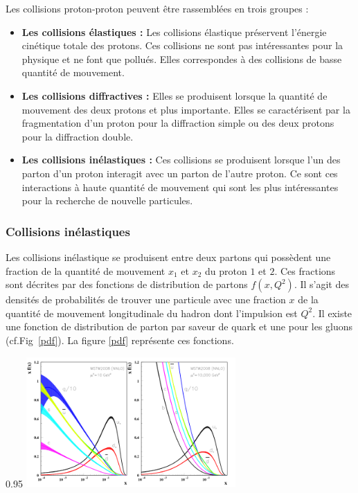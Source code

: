 Les collisions proton-proton peuvent être rassemblées en trois groupes :
\begin{itemize}[label=$\bullet$]
	\item \textbf{Les collisions élastiques : } Les collisions élastique préservent l'énergie cinétique totale des protons. Ces collisions ne sont pas intéressantes pour la physique et ne font que pollués. Elles correspondes à des collisions de basse quantité de mouvement.
	\item\textbf{Les collisions diffractives : } Elles se produisent lorsque la quantité de mouvement des deux protons et plus importante. Elles se caractérisent par la fragmentation d'un proton pour la diffraction simple ou des deux protons pour la diffraction double.
	\item \textbf{Les collisions inélastiques : } Ces collisions se produisent lorsque l'un des parton d'un proton interagit avec un parton de l'autre proton. Ce sont ces interactions à haute quantité de mouvement qui sont les plus intéressantes pour la recherche de nouvelle particules.
\end{itemize}

\subsubsection{Collisions inélastiques}
Les collisions inélastique se produisent entre deux partons qui possèdent une fraction de la quantité de mouvement $x_{1}$ et $x_{2}$ du proton $1$ et $2$. Ces fractions sont décrites par des fonctions de distribution de partons $f(x,Q^{2})$. Il s'agit des densités de probabilités de trouver une particule avec une fraction $x$ de la quantité de mouvement longitudinale du hadron dont l'impulsion est $Q^{2}$. Il existe une fonction de distribution de parton par saveur de quark et une pour les gluons (cf.Fig~\ref{pdf}). La figure \ref{pdf} représente ces fonctions.

\begin{minipagewithmarginpars}[ht!]{0.95\textwidth}
	\centering
	\includegraphics[width=0.6\textwidth]{LHC/pdf.png}
	\label{pdf}	
\end{minipagewithmarginpars}
 

